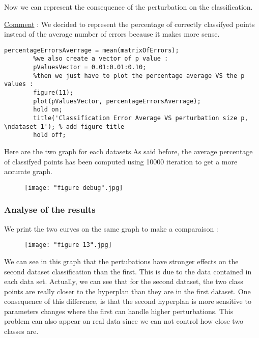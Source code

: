 \documentclass[a4paper]{article}
\begin{document}
	
	Now we can represent the consequence of the perturbation on the classification.
	
	\underline{Comment} : We decided to represent the percentage of correctly classifyed points instead of the average number of errors because it makes more sense.
	\begin{lstlisting}[frame=single]
		percentageErrorsAverrage = mean(matrixOfErrors);
		%we also create a vector of p value :
		pValuesVector = 0.01:0.01:0.10;
		%then we just have to plot the percentage average VS the p values :
		figure(11);
		plot(pValuesVector, percentageErrorsAverrage);
		hold on;
		title('Classification Error Average VS perturbation size p, \ndataset 1'); % add figure title
		hold off;
	\end{lstlisting}
	
	Here are the two graph for each datasets.As said before, the average percentage of classifyed points has been computed using 10000 iteration to get a more accurate graph.
	
	\begin{figure}[h]
		\begin{center}
			\centering
			\texttt{[image: "figure debug".jpg]}
		\end{center}
	\end{figure}

	
	\pagebreak
	
		\subsubsection{Analyse of the results}
		
		We print the two curves on the same graph to make a comparaison :
		\begin{figure}[h]
			\begin{center}
				\texttt{[image: "figure 13".jpg]}
			\end{center}
		\end{figure}
	
		We can see in this graph that the pertubations have stronger effects on the second dataset classification than the first. This is due to the data contained in each data set. Actually, we can see that for the second dataset, the two class points are really closer to the hyperplan than they are in the first dataset. One consequence of this difference, is that the second hyperplan is more sensitive to parameters changes where the first can handle higher perturbations. This problem can also appear on real data since we can not control how close two classes are.
	
\end{document}
